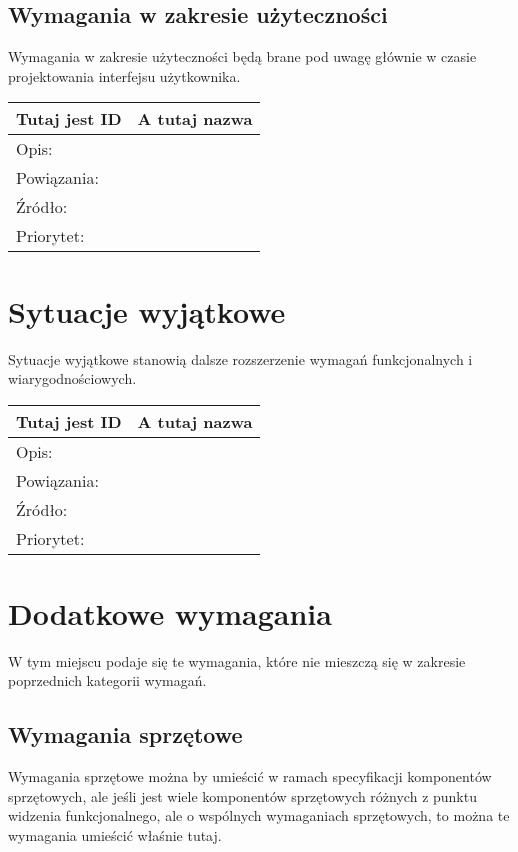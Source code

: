 \documentclass[a4paper,10pt]{article}
\begin{document}
\subsection{Wymagania w zakresie użyteczności}

Wymagania w zakresie użyteczności będą brane pod uwagę głównie w czasie projektowania interfejsu użytkownika.

\begin{tabular}{|p{3cm}|p{9cm}|} \hline

Tutaj jest ID & A tutaj nazwa \\ \hline
Opis: &  \\ \hline
Powiązania: &  \\ \hline
Źródło: &  \\ \hline
Priorytet: &  \\ \hline

\end{tabular}


\section{Sytuacje wyjątkowe}

Sytuacje wyjątkowe stanowią dalsze rozszerzenie wymagań funkcjonalnych i wiarygodnościowych.


\begin{tabular}{|p{3cm}|p{9cm}|} \hline

Tutaj jest ID & A tutaj nazwa \\ \hline
Opis: &  \\ \hline
Powiązania: &  \\ \hline
Źródło: &  \\ \hline
Priorytet: &  \\ \hline

\end{tabular}


\section{Dodatkowe wymagania}

W tym miejscu podaje się te wymagania, które nie mieszczą się w zakresie poprzednich kategorii wymagań.

\subsection{Wymagania sprzętowe}

Wymagania sprzętowe można by umieścić w ramach specyfikacji komponentów sprzętowych, ale jeśli jest wiele komponentów sprzętowych różnych z punktu widzenia funkcjonalnego, ale o wspólnych wymaganiach sprzętowych, to można te wymagania umieścić właśnie tutaj.
\end{document}
